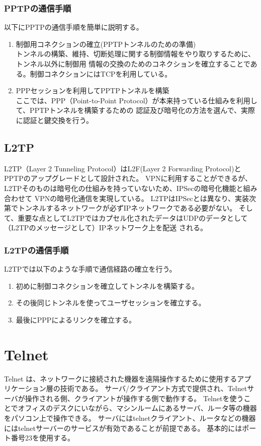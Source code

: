 \documentclass[11pt,a4j,titlepage]{jreport}
\begin{document}
\subsubsection*{PPTPの通信手順}
以下にPPTPの通信手順を簡単に説明する。
\begin{enumerate}
    \setlength{\parskip}{0.05cm} %
    \setlength{\itemsep}{0.05cm}
    \item 制御用コネクションの確立(PPTPトンネルのための準備)\mbox{}\\
    トンネルの構築、維持、切断処理に関する制御情報をやり取りするために、トンネル以外に制御用
    情報の交換のためのコネクションを確立することである。制御コネクションにはTCPを利用している。
    \item PPPセッションを利用してPPTPトンネルを構築\mbox{}\\
    ここでは、PPP（Point-to-Point Protocol）\cite{RFC1661}が本来持っている仕組みを利用して、PPTPトンネルを構築するための
    認証及び暗号化の方法を選んで、実際に認証と鍵交換を行う。
\end{enumerate}

\subsection{L2TP}
L2TP（Layer 2 Tunneling Protocol）\cite{RFC2661}はL2F(Layer 2 Forwarding Protocol)\cite{RFC2341}とPPTPのアップグレードとして設計された。
VPNに利用することができるが、L2TPそのものは暗号化の仕組みを持っていないため、IPSecの暗号化機能と組み合わせて
VPNの暗号化通信を実現している。
L2TPはIPSecとは異なり、実装次第でトンネルするネットワークが必ずIPネットワークである必要がない。
そして、重要な点としてL2TPではカプセル化されたデータはUDPのデータとして（L2TPのメッセージとして）IPネットワーク上を配送
される。
\subsubsection*{L2TPの通信手順}
L2TPでは以下のような手順で通信経路の確立を行う。
\begin{enumerate}
    \setlength{\parskip}{0.05cm} %
    \setlength{\itemsep}{0.05cm}
    \item 初めに制御コネクションを確立してトンネルを構築する。
    \item その後同じトンネルを使ってユーザセッションを確立する。
    \item 最後にPPPによるリンクを確立する。
\end{enumerate}


\section{Telnet}
Telnet \cite{RFC97}は、ネットワークに接続された機器を遠隔操作するために使用するアプリケーション層の技術である。
サーバ/クライアント方式で提供され、Telnetサーバが操作される側、クライアントが操作する側で動作する。
Telnetを使うことでオフィスのデスクにいながら、マシンルームにあるサーバ、ルータ等の機器をパソコン上で操作できる。
サーバにはtelnetクライアント、ルータなどの機器にはtelnetサーバーのサービスが有効であることが前提である。
基本的にはポート番号23を使用する。
\end{document}
